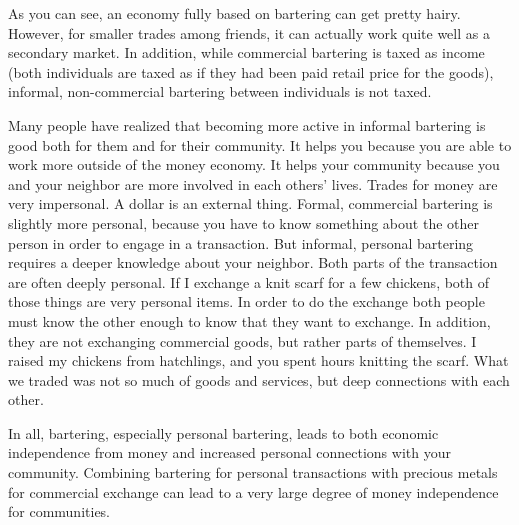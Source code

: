 As you can see, an economy fully based on bartering can get pretty hairy.  However,
for smaller trades among friends, it can actually work quite well as a secondary
market.  In addition, while commercial bartering is taxed as income (both individuals
are taxed as if they had been paid retail price for the goods), informal, non-commercial
bartering between individuals is not taxed.

Many people have realized that becoming more active in informal bartering is good both
for them and for their community.  It helps you because you are able to work more outside
of the money economy.  It helps your community because you and your neighbor are more
involved in each others' lives.  Trades for money are very impersonal.  A dollar is
an external thing.  Formal, commercial bartering is slightly more personal, because
you have to know something about the other person in order to engage in a transaction.
But informal, personal bartering requires a deeper knowledge about your neighbor.
Both parts of the transaction are often deeply personal.  If I exchange a knit scarf
for a few chickens, both of those things are very personal items.  In order to do
the exchange both people must know the other enough to know that they want to exchange.
In addition, they are not exchanging commercial goods, but rather parts of themselves.
I raised my chickens from hatchlings, and you spent hours knitting the scarf.  What
we traded was not so much of goods and services, but deep connections with each other.

In all, bartering, especially personal bartering, leads to both economic independence
from money and increased personal connections with your community.  Combining bartering
for personal transactions with precious metals for commercial exchange can lead to a 
very large degree of money independence for communities.

